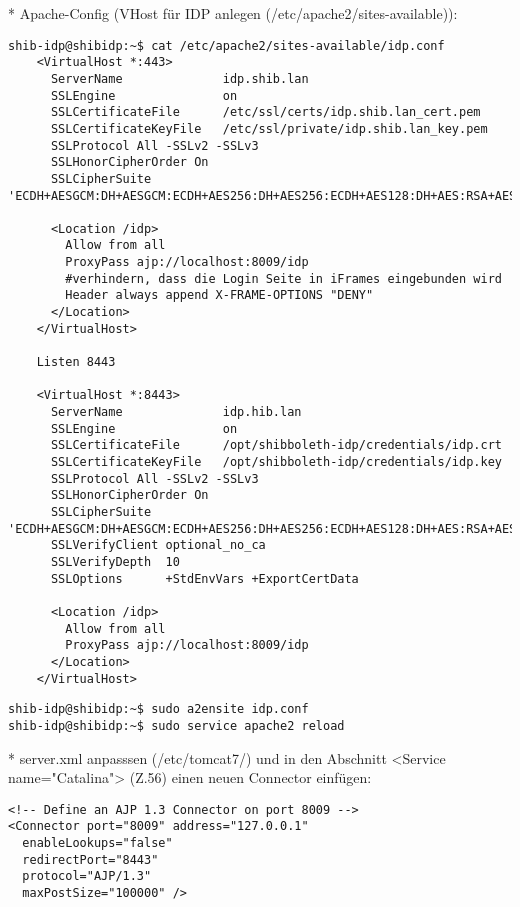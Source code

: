 * Apache-Config (VHost für IDP anlegen (/etc/apache2/sites-available)):
\begin{lstlisting}
shib-idp@shibidp:~$ cat /etc/apache2/sites-available/idp.conf
	<VirtualHost *:443>
	  ServerName              idp.shib.lan
	  SSLEngine               on
	  SSLCertificateFile      /etc/ssl/certs/idp.shib.lan_cert.pem
	  SSLCertificateKeyFile   /etc/ssl/private/idp.shib.lan_key.pem
	  SSLProtocol All -SSLv2 -SSLv3
	  SSLHonorCipherOrder On
	  SSLCipherSuite 'ECDH+AESGCM:DH+AESGCM:ECDH+AES256:DH+AES256:ECDH+AES128:DH+AES:RSA+AESGCM:RSA+AES:ECDH+3DES:DH+3DES:RSA+3DES:!aNULL:!eNULL:!LOW:!RC4:!MD5:!EXP:!PSK:!DSS:!SEED:!ECDSA:!CAMELLIA'

	  <Location /idp>
		Allow from all
		ProxyPass ajp://localhost:8009/idp
		#verhindern, dass die Login Seite in iFrames eingebunden wird
		Header always append X-FRAME-OPTIONS "DENY"
	  </Location>
	</VirtualHost>
	 
	Listen 8443
	 
	<VirtualHost *:8443>
	  ServerName              idp.hib.lan
	  SSLEngine               on
	  SSLCertificateFile      /opt/shibboleth-idp/credentials/idp.crt
	  SSLCertificateKeyFile   /opt/shibboleth-idp/credentials/idp.key
	  SSLProtocol All -SSLv2 -SSLv3
	  SSLHonorCipherOrder On
	  SSLCipherSuite 'ECDH+AESGCM:DH+AESGCM:ECDH+AES256:DH+AES256:ECDH+AES128:DH+AES:RSA+AESGCM:RSA+AES:ECDH+3DES:DH+3DES:RSA+3DES:!aNULL:!eNULL:!LOW:!RC4:!MD5:!EXP:!PSK:!DSS:!SEED:!ECDSA:!CAMELLIA'
	  SSLVerifyClient optional_no_ca
	  SSLVerifyDepth  10
	  SSLOptions      +StdEnvVars +ExportCertData
	 
	  <Location /idp>
		Allow from all
		ProxyPass ajp://localhost:8009/idp
	  </Location>
	</VirtualHost>
\end{lstlisting}			
\begin{lstlisting}
shib-idp@shibidp:~$ sudo a2ensite idp.conf 
shib-idp@shibidp:~$ sudo service apache2 reload
\end{lstlisting}		
* server.xml anpasssen (/etc/tomcat7/) und in den Abschnitt <Service name="Catalina"> (Z.56) einen neuen Connector einfügen:
\begin{lstlisting}
<!-- Define an AJP 1.3 Connector on port 8009 -->
<Connector port="8009" address="127.0.0.1"
  enableLookups="false" 
  redirectPort="8443"
  protocol="AJP/1.3"
  maxPostSize="100000" />
\end{lstlisting}

